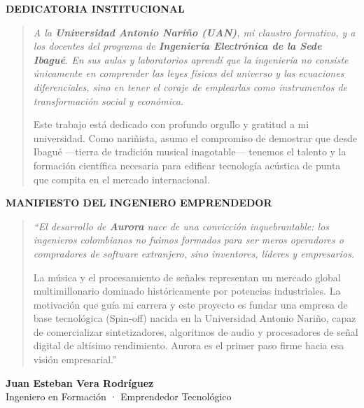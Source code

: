 \documentclass[11pt,a4paper]{article}
\begin{document}
\begin{center}
    {\Large \bfseries \textcolor{uanblue}{DEDICATORIA INSTITUCIONAL}}
\end{center}

\vspace{0.8cm}

\begin{quote}
\itshape
A la \textbf{Universidad Antonio Nariño (UAN)}, mi claustro formativo, y a los docentes del programa de \textbf{Ingeniería Electrónica de la Sede Ibagué}. En sus aulas y laboratorios aprendí que la ingeniería no consiste únicamente en comprender las leyes físicas del universo y las ecuaciones diferenciales, sino en tener el coraje de emplearlas como instrumentos de transformación social y económica.

Este trabajo está dedicado con profundo orgullo y gratitud a mi universidad. Como nariñista, asumo el compromiso de demostrar que desde Ibagué —tierra de tradición musical inagotable— tenemos el talento y la formación científica necesaria para edificar tecnología acústica de punta que compita en el mercado internacional.
\end{quote}

\vspace{1.5cm}

\begin{center}
    {\Large \bfseries \textcolor{uanblue}{MANIFIESTO DEL INGENIERO EMPRENDEDOR}}
\end{center}

\vspace{0.8cm}

\begin{quote}
\itshape
``El desarrollo de \textbf{Aurora} nace de una convicción inquebrantable: los ingenieros colombianos no fuimos formados para ser meros operadores o compradores de software extranjero, sino inventores, líderes y empresarios. 

La música y el procesamiento de señales representan un mercado global multimillonario dominado históricamente por potencias industriales. La motivación que guía mi carrera y este proyecto es fundar una empresa de base tecnológica (Spin-off) nacida en la Universidad Antonio Nariño, capaz de comercializar sintetizadores, algoritmos de audio y procesadores de señal digital de altísimo rendimiento. Aurora es el primer paso firme hacia esa visión empresarial.''
\end{quote}

\begin{flushright}
\textbf{Juan Esteban Vera Rodríguez}\\
\small Ingeniero en Formación · Emprendedor Tecnológico
\end{flushright}
\end{document}
